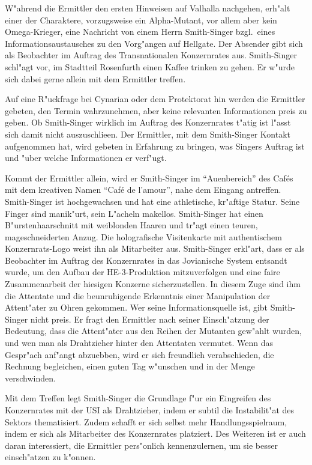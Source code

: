 
W"ahrend die Ermittler den ersten Hinweisen auf Valhalla nachgehen, erh"alt einer der Charaktere, vorzugsweise ein Alpha-Mutant, vor allem aber kein Omega-Krieger, eine Nachricht von einem Herrn Smith-Singer bzgl.~eines Informationsaustausches zu den Vorg"angen auf Hellgate. Der Absender gibt sich als Beobachter im Auftrag des Transnationalen Konzernrates aus. Smith-Singer schl"agt vor, im Stadtteil Rosenfurth einen Kaffee trinken zu gehen. Er w"urde sich dabei gerne allein mit dem Ermittler treffen. 

Auf eine R"uckfrage bei Cynarian oder dem Protektorat hin werden die Ermittler gebeten, den Termin wahrzunehmen, aber keine relevanten Informationen preis zu geben. Ob Smith-Singer wirklich im Auftrag des Konzernrates t"atig ist l"asst sich damit nicht auszuschlie\3en. Der Ermittler, mit dem Smith-Singer Kontakt aufgenommen hat, wird gebeten in Erfahrung zu bringen, was Singers Auftrag ist und "uber welche Informationen er verf"ugt. 

Kommt der Ermittler allein, wird er Smith-Singer im ``Au\3enbereich'' des Caf\'es mit dem kreativen Namen ``Caf\'e de l'amour'', nahe dem Eingang antreffen. Smith-Singer ist hochgewachsen und hat eine athletische, kr"aftige Statur. Seine Finger sind manik"urt, sein L"acheln makellos. Smith-Singer hat einen B"urstenhaarschnitt mit wei\3blonden Haaren und tr"agt einen teuren, ma\3geschneiderten Anzug. Die holografische Visitenkarte mit authentischem Konzernrats-Logo weist ihn als Mitarbeiter aus. Smith-Singer erkl"art, dass er als Beobachter im Auftrag des Konzernrates in das Jovianische System entsandt wurde, um den Aufbau der HE-3-Produktion mitzuverfolgen und eine faire Zusammenarbeit der hiesigen Konzerne sicherzustellen. In diesem Zuge sind ihm die Attentate und die beunruhigende Erkenntnis einer Manipulation der Attent"ater zu Ohren gekommen. Wer seine Informationsquelle ist, gibt Smith-Singer nicht preis. Er fragt den Ermittler nach seiner Einsch"atzung der Bedeutung, dass die Attent"ater aus den Reihen der Mutanten gew"ahlt wurden, und wen man als Drahtzieher hinter den Attentaten vermutet. Wenn das Gespr"ach anf"angt abzuebben, wird er sich freundlich verabschieden, die Rechnung begleichen, einen guten Tag w"unschen und in der Menge verschwinden.

Mit dem Treffen legt Smith-Singer die Grundlage f"ur ein Eingreifen des Konzernrates mit der USI als Drahtzieher, indem er subtil die Instabilit"at des Sektors thematisiert. Zudem schafft er sich selbst mehr Handlungsspielraum, indem er sich als Mitarbeiter des Konzernrates platziert. Des Weiteren ist er auch daran interessiert, die Ermittler pers"onlich kennenzulernen, um sie besser einsch"atzen zu k"onnen.

